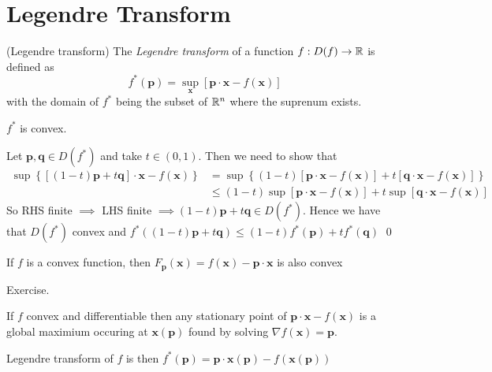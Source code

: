 \documentclass{article}
\begin{document}
\section{Legendre Transform}
\begin{definition}
	(Legendre transform) The \textit{Legendre transform} of a function $ f:D(f)\to \mathbb{R} $ is defined as
	\[
		f^*(\mathbf p)=\sup_{\mathbf x}\left[\mathbf p\cdot \mathbf x-f(\mathbf x)\right]
	\]
	with the domain of $ f^* $ being the subset of $ \mathbb{R}^n $ where the suprenum exists.
\end{definition}
\begin{claim}
  $ f^* $ is convex.
\end{claim}
\pf Let $ \mathbf p,\mathbf q\in D(f^*) $ and take $ t\in (0,1) $. Then we need to show that
\begin{align*}
	\sup\left\{\left[(1-t)\mathbf p +t\mathbf q\right]\cdot \mathbf x-f(\mathbf x)\right\}&=\sup\left\{(1-t)[\mathbf p \cdot \mathbf x-f(\mathbf x)]+t[\mathbf q\cdot \mathbf x-f(\mathbf x)]\right\}\\
									&\le (1-t)\sup[\mathbf p\cdot\mathbf x- f(\mathbf x)]+t\sup[\mathbf q\cdot \mathbf x - f(\mathbf x)]
\end{align*}
So RHS finite $ \implies $ LHS finite $ \implies (1-t)\mathbf p + t\mathbf q \in D(f^*)$. Hence we have that $ D(f^*) $ convex and $ f^*((1-t)\mathbf p+t\mathbf q) \le (1-t)f^*(\mathbf p)+tf^*(\mathbf q) $ \qed
\begin{claim}
	If $ f $ is a convex function, then $ F_{\mathbf p}(\mathbf x)=f(\mathbf x)-\mathbf p\cdot\mathbf x $ is also convex
\end{claim}
\pf Exercise.
\begin{corollary}
  If $ f $ convex and differentiable then any stationary point of $ \mathbf p\cdot\mathbf x - f(\mathbf x) $ is a global maximium occuring at $ \mathbf x(\mathbf p)  $ found by solving $ \nabla f(\mathbf x)=\mathbf p $.
\end{corollary}
Legendre transform of $ f $ is then $ f^*(\mathbf p)=\mathbf p \cdot \mathbf x(\mathbf p)-f(\mathbf x(\mathbf p)) $
\end{document}
